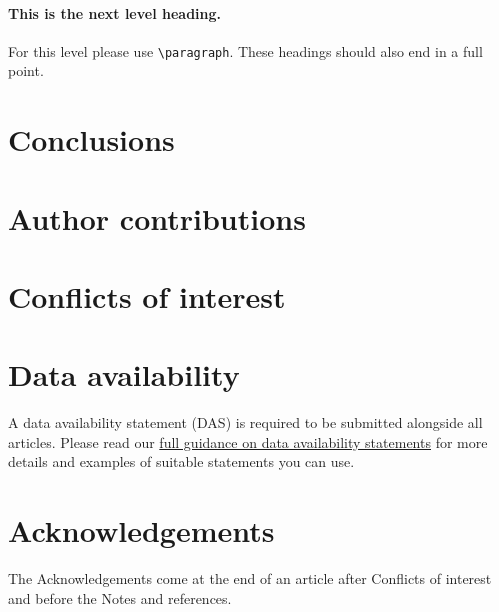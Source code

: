 \documentclass[twoside,twocolumn,9pt]{article}
\begin{document}
\paragraph{This is the next level heading.~~} For this level please use \texttt{\textbackslash paragraph}. These headings should also end in a full point.


\section*{Conclusions}


\section*{Author contributions}

\section*{Conflicts of interest}

\section*{Data availability}


A data availability statement (DAS) is required to be submitted alongside all articles. Please read our \href{https://www.rsc.org/journals-books-databases/author-and-reviewer-hub/authors-information/prepare-and-format/data-sharing/#dataavailabilitystatements}{full guidance on data availability statements} for more details and examples of suitable statements you can use.

\section*{Acknowledgements}
The Acknowledgements come at the end of an article after Conflicts of interest and before the Notes and references.
\end{document}
